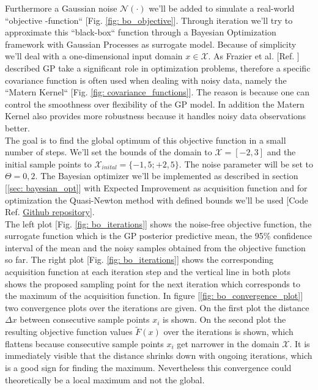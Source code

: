 \documentclass[12pt, a4paper]{article}
\begin{document}
Furthermore a Gaussian noise $\mathcal{N}(\cdot)$ we'll be added to simulate a real-world ``objective -function`` [Fig. \ref{fig: bo_objective}]. 
Through iteration we'll try to approximate this ``black-box`` function through a Bayesian Optimization framework with Gaussian Processes as surrogate model. Because of simplicity we'll deal with a one-dimensional input domain $x \in \mathcal{X}$.
As Frazier et al. [Ref. \cite{Frazier2018}] described GP take a significant role in optimization problems, therefore a specific covariance function is often used when dealing with noisy data, namely the ``Matern Kernel`` [Fig. \ref{fig: covariance_functions}]. The reason is because one can control the smoothness over flexibility of the GP model. In addition the Matern Kernel also provides more robustness because it handles noisy data observations better. \\
The goal is to find the global optimum of this objective function in a small number of steps. We'll set the bounds of the domain to $\mathcal{X} = [-2, 3]$ and the initial sample points to $\mathcal{X}_{inital} = \{-1,5;+2,5\}$. The noise parameter will be set to $\Theta = 0,2$.
The Bayesian optimizer we'll be implemented as described in section [\ref{sec: bayesian_opt}] with Expected Improvement as acquisition function and for optimization the Quasi-Newton method with defined bounds we'll be used [Code Ref. \href{https://github.com/probabilis/bs_ml/tree/master/from_scratch}{Github repository}]. \\
The left plot [Fig. \ref{fig: bo_iterations}] shows the noise-free objective function, the surrogate function which is the GP posterior predictive mean, the 95\% confidence interval of the mean and the noisy samples obtained from the objective function so far. The right plot [Fig. \ref{fig: bo_iterations}] shows the corresponding acquisition function at each iteration step and the vertical line in both plots shows the proposed sampling point for the next iteration which corresponds to the maximum of the acquisition function. In figure [\ref{fig: bo_convergence_plot}] two convergence plots over the iterations are given.
On the first plot the distance $\Delta{x}$ between consecutive sample points $x_i$ is shown. On the second plot the resulting objective function values $\tilde{F}(x)$ over the iterations is shown, which flattens because consecutive sample points $x_i$ get narrower in the domain $\mathcal{X}$. It is immediately visible that the distance shrinks down with ongoing iterations, which is a good sign for finding the maximum. Nevertheless this convergence could theoretically be a local maximum and not the global.
\end{document}
